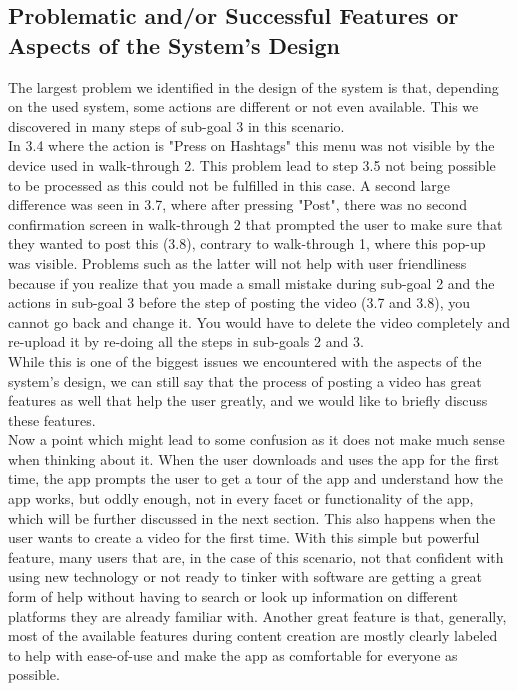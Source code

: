 \documentclass[12pt, letterpaper]{article}
\begin{document}
\subsection{Problematic and/or Successful Features or Aspects of the System’s Design}
The largest problem we identified in the design of the system is that, depending on the used system, some actions are different or not even available. This we discovered in many steps of sub-goal 3 in this scenario. \\
In 3.4 where the action is "Press on Hashtags" this menu was not visible by the device used in walk-through 2. This problem lead to step 3.5 not being possible to be processed as this could not be fulfilled in this case.
A second large difference was seen in 3.7, where after pressing "Post", there was no second confirmation screen in walk-through 2 that prompted the user to make sure that they wanted to post this (3.8), contrary to walk-through 1, where this pop-up was visible. Problems such as the latter will not help with user friendliness because if you realize that you made a small mistake during sub-goal 2 and the actions in sub-goal 3 before the step of posting the video (3.7 and 3.8), you cannot go back and change it. You would have to delete the video completely and re-upload it by re-doing all the steps in sub-goals 2 and 3.\\
While this is one of the biggest issues we encountered with the aspects of the system's design, we can still say that the process of posting a video has great features as well that help the user greatly, and we would like to briefly discuss these features.\\
Now a point which might lead to some confusion as it does not make much sense when thinking about it. When the user downloads and uses the app for the first time, the app prompts the user to get a tour of the app and understand how the app works, but oddly enough, not in every facet or functionality of the app, which will be further discussed in the next section. This also happens when the user wants to create a video for the first time. With this simple but powerful feature, many users that are, in the case of this scenario, not that confident with using new technology or not ready to tinker with software are getting a great form of help without having to search or look up information on different platforms they are already familiar with. Another great feature is that, generally, most of the available features during content creation are mostly clearly labeled to help with ease-of-use and make the app as comfortable for everyone as possible.\newpage
\end{document}
